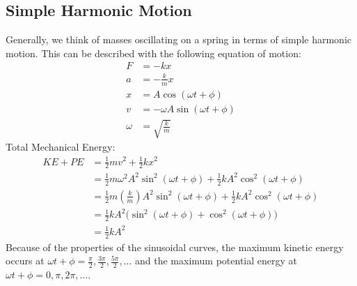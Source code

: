 \documentclass{math}
\begin{document}
\subsection*{Simple Harmonic Motion}
Generally, we think of masses oscillating on a spring in terms of simple
harmonic motion. This can be described with the following equation of motion:
\begin{align*}
  F &= -kx \\
  a &= -\frac{k}{m}x \\
  x &= A\cos(\omega t+\phi) \\
  v &= -\omega A\sin(\omega t+\phi) \\
  \omega &= \sqrt{\frac{k}{m}}
\end{align*}
Total Mechanical Energy:
\begin{align*}
  KE+PE &= \frac{1}{2}mv^2+\frac{1}{2}kx^2 \\
  &= \frac{1}{2}m\omega^2A^2\sin^2(\omega t+\phi)+
    \frac{1}{2}kA^2\cos^2(\omega t+\phi) \\
  &= \frac{1}{2}m(\frac{k}{m})A^2\sin^2(\omega t+\phi)+
    \frac{1}{2}kA^2\cos^2(\omega t+\phi) \\
  &= \frac{1}{2}kA^2\bigg(\sin^2(\omega t+\phi)+\cos^2(\omega t+\phi)\bigg) \\
  &= \frac{1}{2}kA^2
\end{align*}
Because of the properties of the sinusoidal curves, the maximum kinetic energy
occurs at \( \omega t+\phi = \frac{\pi}{2},\frac{3\pi}{2},\frac{5\pi}{2},\dots
\) and the maximum potential energy at \( \omega t+\phi = 0,\pi,2\pi,\dots \).
\end{document}

